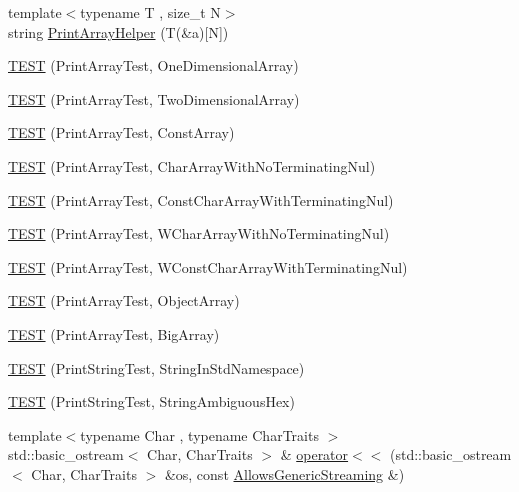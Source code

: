 \begin{DoxyCompactItemize}
\item 
{\footnotesize template$<$typename T , size\+\_\+t N$>$ }\\string \hyperlink{namespacetesting_1_1gtest__printers__test_a10300ded1e327c98c6a36beb7ad49e58}{Print\+Array\+Helper} (T(\&a)\mbox{[}N\mbox{]})
\item 
\hyperlink{namespacetesting_1_1gtest__printers__test_a3845c4717b03cb5ad309c7d9a37acb0a}{T\+E\+ST} (Print\+Array\+Test, One\+Dimensional\+Array)
\item 
\hyperlink{namespacetesting_1_1gtest__printers__test_ac366b9ec749b2499d21583d3b8f86273}{T\+E\+ST} (Print\+Array\+Test, Two\+Dimensional\+Array)
\item 
\hyperlink{namespacetesting_1_1gtest__printers__test_a8b5638f178c12f58707ca0f02a3b4d41}{T\+E\+ST} (Print\+Array\+Test, Const\+Array)
\item 
\hyperlink{namespacetesting_1_1gtest__printers__test_a3bae023a42049745b49fa1f2db9a0cb2}{T\+E\+ST} (Print\+Array\+Test, Char\+Array\+With\+No\+Terminating\+Nul)
\item 
\hyperlink{namespacetesting_1_1gtest__printers__test_ab51b9ecaca7d635326101b23d5e8afd2}{T\+E\+ST} (Print\+Array\+Test, Const\+Char\+Array\+With\+Terminating\+Nul)
\item 
\hyperlink{namespacetesting_1_1gtest__printers__test_ac19ec2732031bfe83b30ea9f00259ef3}{T\+E\+ST} (Print\+Array\+Test, W\+Char\+Array\+With\+No\+Terminating\+Nul)
\item 
\hyperlink{namespacetesting_1_1gtest__printers__test_a6a7cbcdbe748a1d4e90658f48f36c9da}{T\+E\+ST} (Print\+Array\+Test, W\+Const\+Char\+Array\+With\+Terminating\+Nul)
\item 
\hyperlink{namespacetesting_1_1gtest__printers__test_af91d8ad9d6c7547913fe05c7acc44114}{T\+E\+ST} (Print\+Array\+Test, Object\+Array)
\item 
\hyperlink{namespacetesting_1_1gtest__printers__test_a596493b56489aa1571fa26d1402e7116}{T\+E\+ST} (Print\+Array\+Test, Big\+Array)
\item 
\hyperlink{namespacetesting_1_1gtest__printers__test_abbd355e76033f0defd76c37523ad0f60}{T\+E\+ST} (Print\+String\+Test, String\+In\+Std\+Namespace)
\item 
\hyperlink{namespacetesting_1_1gtest__printers__test_ac20ee165500471e363011c3f664d2fb8}{T\+E\+ST} (Print\+String\+Test, String\+Ambiguous\+Hex)
\item 
{\footnotesize template$<$typename Char , typename Char\+Traits $>$ }\\std\+::basic\+\_\+ostream$<$ Char, Char\+Traits $>$ \& \hyperlink{namespacetesting_1_1gtest__printers__test_a1eb0213095e639d357692066e8505887}{operator$<$$<$} (std\+::basic\+\_\+ostream$<$ Char, Char\+Traits $>$ \&os, const \hyperlink{classtesting_1_1gtest__printers__test_1_1_allows_generic_streaming}{Allows\+Generic\+Streaming} \&)

\end{DoxyCompactItemize}
